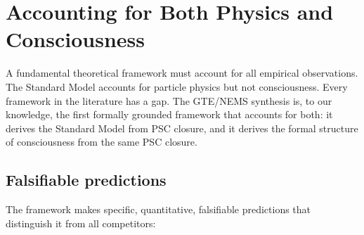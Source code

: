 \documentclass[11pt]{article}
\theoremstyle{remark}
\begin{document}
\section{Accounting for Both Physics and Consciousness}\label{sec:complete}

A fundamental theoretical framework must account for all empirical observations. The
Standard Model accounts for particle physics but not consciousness. Every framework
in the literature has a gap. The GTE/NEMS synthesis is, to our knowledge, the first
formally grounded framework that accounts for both: it derives the Standard Model
from PSC closure, and it derives the formal structure of consciousness from the same
PSC closure.

\subsection{Falsifiable predictions}\label{sec:falsifiable}

The framework makes specific, quantitative, falsifiable predictions that distinguish
it from all competitors:
\end{document}
